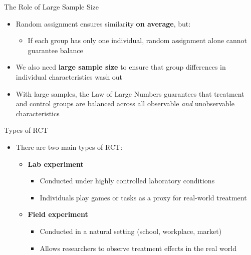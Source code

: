 \documentclass[hyperref={pdfpagelabels=false}]{beamer}
\begin{document}
	\begin{frame}{The Role of Large Sample Size}
		\begin{itemize}
			\item Random assignment ensures similarity \textbf{on average}, but:
			\vspace{0.2cm}
			\begin{itemize}
				\item If each group has only one individual, random assignment alone cannot guarantee balance
			\end{itemize}
			\vspace{0.3cm}
			\item We also need \textbf{large sample size} to ensure that group differences in individual characteristics wash out
			\vspace{0.3cm}
			\item With large samples, the Law of Large Numbers guarantees that treatment and control groups are balanced across all observable \emph{and} unobservable characteristics
		\end{itemize}
	\end{frame}
	
	\begin{frame}{Types of RCT}
		\begin{itemize}
			\item There are two main types of RCT:
			\vspace{0.2cm}
			\begin{itemize}
				\item[1] \textbf{Lab experiment}
				\vspace{0.2cm}
				\begin{itemize}
					\item Conducted under highly controlled laboratory conditions
					\vspace{0.1cm}
					\item Individuals play games or tasks as a proxy for real-world treatment
				\end{itemize}
				\vspace{0.3cm}
				\item[2] \textbf{Field experiment}
				\vspace{0.2cm}
				\begin{itemize}
					\item Conducted in a natural setting (school, workplace, market)
					\vspace{0.1cm}
					\item Allows researchers to observe treatment effects in the real world
				\end{itemize}
			\end{itemize}
		\end{itemize}
	\end{frame}
\end{document}
